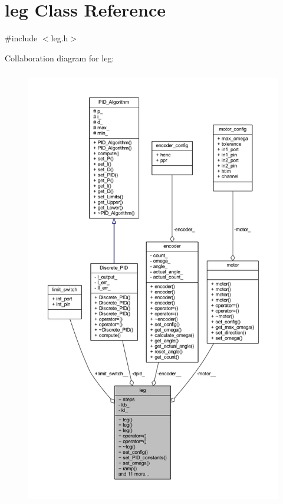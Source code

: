 \hypertarget{classleg}{}\section{leg Class Reference}
\label{classleg}


{\ttfamily \#include $<$leg.\+h$>$}



Collaboration diagram for leg\+:
\nopagebreak
\begin{figure}[H]
\begin{center}
\leavevmode
\includegraphics[height=550pt]{classleg__coll__graph}
\end{center}
\end{figure}
